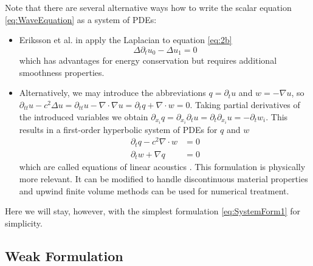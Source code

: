 \documentclass[a4paper,12pt]{article}
\begin{document}
Note that there are several alternative ways how to write the scalar equation
\eqref{eq:WaveEquation} as a system of PDEs:
\begin{itemize}
\item Eriksson et al. in \cite{Eriksson} apply the Laplacian to
equation \eqref{eq:2b}
\begin{equation}
\Delta \partial_t u_0 - \Delta u_1 = 0
\end{equation} \label{eq:Eriksson}
which has advantages for energy conservation but requires additional smoothness
properties.
\item Alternatively, we may introduce the abbreviations
$q=\partial_t u$ and $w=-\nabla u$, so $\partial_{tt} u - c^2 \Delta u =
\partial_{tt} u - \nabla\cdot\nabla u = \partial_{t} q + \nabla\cdot w = 0$.
Taking partial derivatives of the introduced variables we obtain $\partial_{x_i} q=
\partial_{x_i} \partial_t u = \partial_t \partial_{x_i}  u = - \partial_t w_i$. This results
in a first-order hyperbolic system of PDEs for $q$ and $w$
\begin{align*}
\partial_t q - c^2 \nabla\cdot w &= 0\\
\partial_t w + \nabla q &= 0
\end{align*}
which are called equations of linear acoustics \cite{LeVeque}. This formulation 
is physically more relevant. It can be modified to handle discontinuous material
properties and upwind finite volume methods can be used for numerical treatment.
\end{itemize}

Here we will stay, however, with the simplest formulation \eqref{eq:SystemForm1}
for simplicity.

\subsection*{Weak Formulation}
\end{document}
